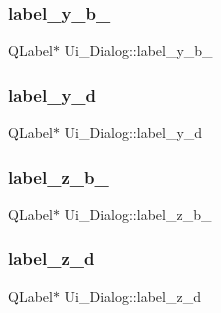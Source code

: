\subsubsection{\texorpdfstring{label\+\_\+y\+\_\+b\+\_}{label\_y\_b\_2}}
{\footnotesize\ttfamily Q\+Label$\ast$ Ui\+\_\+\+Dialog\+::label\+\_\+y\+\_\+b\+\_}

\hypertarget{class_ui___dialog_a6dfc56c2ed0c6f1141dddb9ce6ce65f7}{}\label{class_ui___dialog_a6dfc56c2ed0c6f1141dddb9ce6ce65f7} 
\subsubsection{\texorpdfstring{label\+\_\+y\+\_\+d}{label\_y\_d}}
{\footnotesize\ttfamily Q\+Label$\ast$ Ui\+\_\+\+Dialog\+::label\+\_\+y\+\_\+d}

\hypertarget{class_ui___dialog_a6ca6cabd6bb980d5804d866d1c166dd7}{}\label{class_ui___dialog_a6ca6cabd6bb980d5804d866d1c166dd7} 
\subsubsection{\texorpdfstring{label\+\_\+z\+\_\+b\+\_}{label\_z\_b\_2}}
{\footnotesize\ttfamily Q\+Label$\ast$ Ui\+\_\+\+Dialog\+::label\+\_\+z\+\_\+b\+\_}

\hypertarget{class_ui___dialog_a680efd605623366cfbd396c56bfe8fbd}{}\label{class_ui___dialog_a680efd605623366cfbd396c56bfe8fbd} 
\subsubsection{\texorpdfstring{label\+\_\+z\+\_\+d}{label\_z\_d}}
{\footnotesize\ttfamily Q\+Label$\ast$ Ui\+\_\+\+Dialog\+::label\+\_\+z\+\_\+d}

\hypertarget{class_ui___dialog_aebeace7895da27076f8f90c301742ec3}{}\label{class_ui___dialog_aebeace7895da27076f8f90c301742ec3} 
